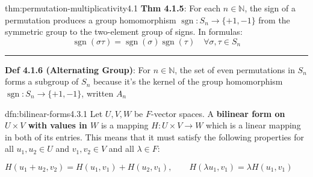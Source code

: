 \documentclass[landscape, 8pt]{extarticle}
\DeclareMathOperator{\sgn}{sgn}
\DeclareMathOperator{\Mat}{Mat}
\begin{document}
\begin{multicols}{3}
\begin{thm}{thm:permutation-multiplicativity}{4.1}
    \textbf{Thm 4.1.5}: For each $n\in \mathbb{N}$, the sign of a permutation produces a group homomorphism $\sgn : S_{n} \to \{+1, -1\}$ from the symmetric group to the two-element group of signs. In formulas:
    \[\sgn(\sigma\tau) = \sgn(\sigma)\sgn(\tau) \quad \forall \sigma, \tau\in S_{n}\]

    \vspace{-5pt}
    \noindent\rule{\textwidth}{0.2pt}

    \textbf{Def 4.1.6 (Alternating Group)}: For $n\in \mathbb{N}$, the set of even permutations in $S_{n}$ forms a subgroup of $S_{n}$ because it's the kernel of the group homomorphism $\sgn : S_{n}\to \{+1, -1\}$, written $A_{n}$
\end{thm}

%
%

\begin{dfn}{dfn:bilinear-forms}{4.3.1}
    Let $U,V,W$ be $F$-vector spaces. A \textbf{bilinear form on $U \times V$ with values in $W$} is a mapping $H: U \times V \to W $ which is a linear mapping in both of its entries. This means that it must satisfy the following properties for all $u_{1}, u_{2}\in U$ and $v_{1}, v_{2}\in V$ and all $\lambda\in F$:

    \vspace{5pt}
        $H(u_{1} + u_{2}, v_{2}) = H(u_{1}, v_{1}) + H(u_{2}, v_{1}), \qquad H(\lambda u_{1}, v_{1}) = \lambda H(u_{1}, v_{1})$


\end{dfn}
\end{multicols}
\end{document}
